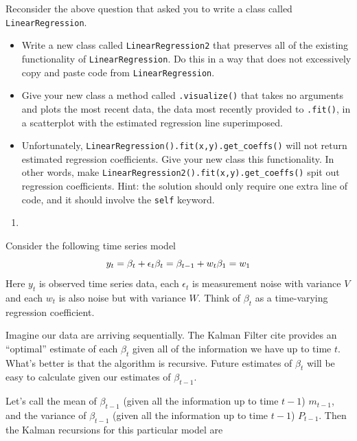 \documentclass[
  12pt,
  krantz2]{krantz}
\providecommand{\tightlist}{%
  \setlength{\itemsep}{0pt}\setlength{\parskip}{0pt}}
\begin{document}
Reconsider the above question that asked you to write a class called \texttt{LinearRegression}.

\begin{itemize}
\tightlist
\item
  Write a new class called \texttt{LinearRegression2} that preserves all of the existing functionality of \texttt{LinearRegression}. Do this in a way that does not excessively copy and paste code from \texttt{LinearRegression}.
\item
  Give your new class a method called \texttt{.visualize()} that takes no arguments and plots the most recent data, the data most recently provided to \texttt{.fit()}, in a scatterplot with the estimated regression line superimposed.
\item
  Unfortunately, \texttt{LinearRegression().fit(x,y).get\_coeffs()} will not return estimated regression coefficients. Give your new class this functionality. In other words, make \texttt{LinearRegression2().fit(x,y).get\_coeffs()} spit out regression coefficients. Hint: the solution should only require one extra line of code, and it should involve the \texttt{self} keyword.
\end{itemize}

\begin{enumerate}
\def\labelenumi{\arabic{enumi}.}
\setcounter{enumi}{2}
\tightlist
\item
\end{enumerate}

Consider the following time series model \citep{West1989BayesianFA}
\[
y_t = \beta_t + \epsilon_t \\
\beta_t = \beta_{t-1} + w_t \\
\beta_1 = w_1
\]
Here \(y_t\) is observed time series data, each \(\epsilon_t\) is measurement noise with variance \(V\) and each \(w_t\) is also noise but with variance \(W\). Think of \(\beta_t\) as a time-varying regression coefficient.

Imagine our data are arriving sequentially. The Kalman Filter \citep{kalman_filt} cite provides an ``optimal'' estimate of each \(\beta_t\) given all of the information we have up to time \(t\). What's better is that the algorithm is recursive. Future estimates of \(\beta_t\) will be easy to calculate given our estimates of \(\beta_{t-1}\).

Let's call the mean of \(\beta_{t-1}\) (given all the information up to time \(t-1\)) \(m_{t-1}\), and the variance of \(\beta_{t-1}\) (given all the information up to time \(t-1\)) \(P_{t-1}\). Then the Kalman recursions for this particular model are
\end{document}
